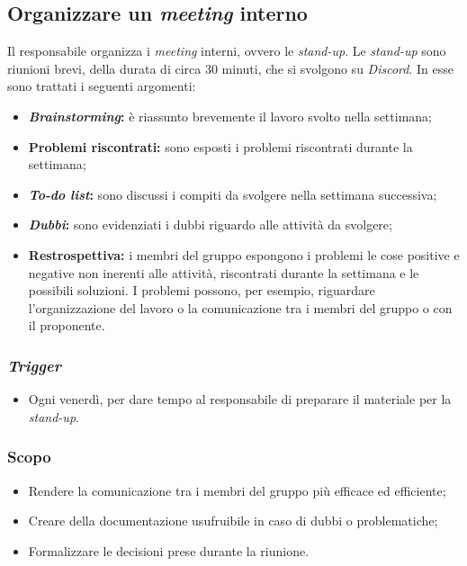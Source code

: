 \subsection{Organizzare un \textit{meeting} interno}
\label{organizzare-meeting-interno}

Il responsabile organizza i \textit{meeting} interni, ovvero le
\textit{stand-up}. Le \textit{stand-up} sono riunioni brevi, della durata di
circa 30 minuti, che si svolgono su \textit{Discord}. In esse sono trattati i
seguenti argomenti:
\begin{itemize}
	\item \textbf{\textit{Brainstorming}:} è riassunto brevemente il lavoro
	      svolto nella settimana;

	\item \textbf{Problemi riscontrati:} sono esposti i problemi riscontrati
	      durante la settimana;

	\item \textbf{\textit{To-do list}:} sono discussi i compiti da svolgere nella
	      settimana successiva;

	\item \textbf{\textit{Dubbi}:} sono evidenziati i dubbi riguardo alle
	      attività da svolgere;

	\item \textbf{Restrospettiva:} i membri del gruppo espongono i problemi le
	      cose positive e negative non inerenti alle attività, riscontrati
	      durante la settimana e le possibili soluzioni. I problemi possono, per
	      esempio, riguardare l'organizzazione del lavoro o la comunicazione tra
	      i membri del gruppo o con il proponente.
\end{itemize}

\subsubsection{\textit{Trigger}}
\begin{itemize}
	\item Ogni venerdì, per dare tempo al responsabile di preparare il materiale
	      per la \textit{stand-up}.
\end{itemize}

\subsubsection{Scopo}
\begin{itemize}
	\item Rendere la comunicazione tra i membri del gruppo più efficace ed
	      efficiente;

	\item Creare della documentazione usufruibile in caso di dubbi o
	      problematiche;

	\item Formalizzare le decisioni prese durante la riunione.
\end{itemize}

